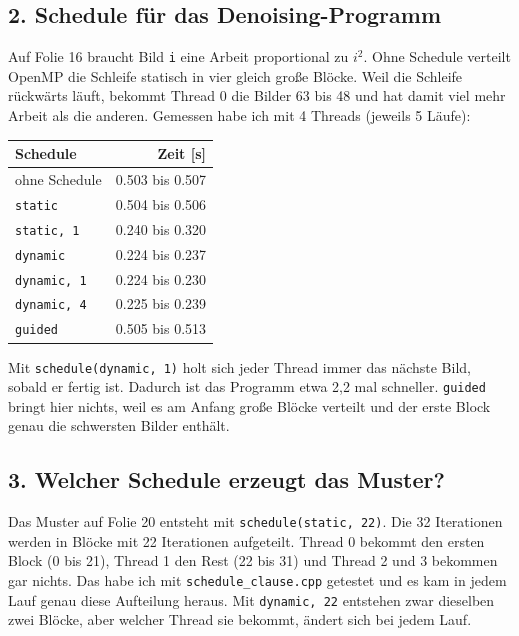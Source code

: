 \documentclass[11pt]{article}
\begin{document}
\subsection*{2. Schedule für das Denoising-Programm}

Auf Folie 16 braucht Bild \texttt{i} eine Arbeit proportional zu $i^2$. Ohne Schedule verteilt
OpenMP die Schleife statisch in vier gleich große Blöcke. Weil die Schleife rückwärts läuft,
bekommt Thread 0 die Bilder 63 bis 48 und hat damit viel mehr Arbeit als die anderen. Gemessen
habe ich mit 4 Threads (jeweils 5 Läufe):

\begin{center}
\begin{tabular}{lr}
Schedule & Zeit [s] \\
\hline
ohne Schedule & 0.503 bis 0.507 \\
\texttt{static} & 0.504 bis 0.506 \\
\texttt{static, 1} & 0.240 bis 0.320 \\
\texttt{dynamic} & 0.224 bis 0.237 \\
\texttt{dynamic, 1} & 0.224 bis 0.230 \\
\texttt{dynamic, 4} & 0.225 bis 0.239 \\
\texttt{guided} & 0.505 bis 0.513 \\
\end{tabular}
\end{center}

Mit \texttt{schedule(dynamic, 1)} holt sich jeder Thread immer das nächste Bild, sobald er fertig
ist. Dadurch ist das Programm etwa 2,2 mal schneller. \texttt{guided} bringt hier nichts, weil es
am Anfang große Blöcke verteilt und der erste Block genau die schwersten Bilder enthält.

\subsection*{3. Welcher Schedule erzeugt das Muster?}

Das Muster auf Folie 20 entsteht mit \texttt{schedule(static, 22)}. Die 32 Iterationen werden in
Blöcke mit 22 Iterationen aufgeteilt. Thread 0 bekommt den ersten Block (0 bis 21), Thread 1 den
Rest (22 bis 31) und Thread 2 und 3 bekommen gar nichts. Das habe ich mit
\texttt{schedule\_clause.cpp} getestet und es kam in jedem Lauf genau diese Aufteilung heraus. Mit
\texttt{dynamic, 22} entstehen zwar dieselben zwei Blöcke, aber welcher Thread sie bekommt, ändert
sich bei jedem Lauf.
\end{document}
